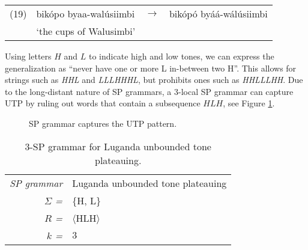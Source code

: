\medskip
\begin{tabular}{llcl}
(19) & bik\'opo byaa-wal\'usiimbi & $\rightarrow$ & bik\'op\'o by\'a\'a-w\'al\'usiimbi \\
& `the cups of Walusimbi' &&
\end{tabular}
\medskip

Using letters $H$ and $L$ to indicate high and low tones, we can express the generalization as ``never have one or more L in-between two H''.
This allows for strings such as \emph{HHL} and \emph{LLLHHHL}, but prohibits ones such as \emph{HHLLLHH}.
Due to the long-distant nature of SP grammars, a $3$-local SP grammar can capture UTP by ruling out words that contain a subsequence $HLH$, see Figure \ref{imdlawnbadsp}.

\begin{figure}[h!]
\begin{center}
\hspace{3em}
\end{center}
\caption{SP grammar captures the UTP pattern.}
\label{imdlawnbadsp}
\end{figure}

{
\renewcommand{\tablename}{Grammar}
\begin{table}[h!]
\begin{center}
\begin{tabular}{rl}
\textit{SP grammar}  & Luganda unbounded tone plateauing \\
\textit{$\Sigma$ =}      &  \{H, L\}   \\
\textit{$R$ =} & $\langle$HLH$\rangle$  \\
\textit{$k$ =}      & $3$          
\end{tabular}
\caption{$3$-SP grammar for Luganda unbounded tone plateauing.}
\label{slwfdocass}
\end{center}
\end{table}
}

